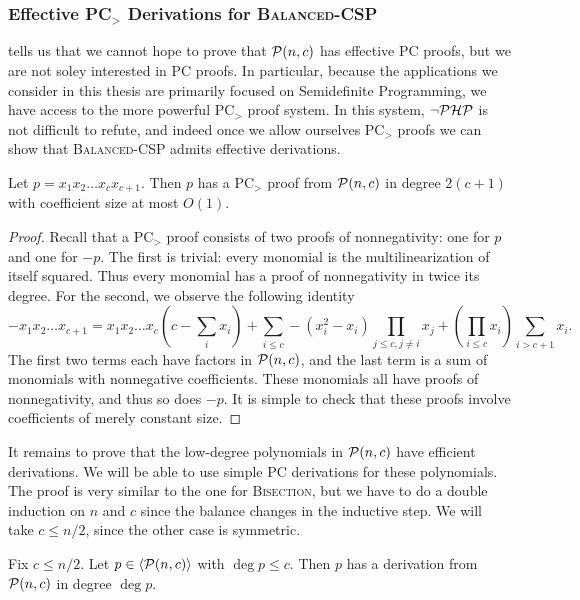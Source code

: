 \subsubsection{Effective PC$_>$ Derivations for \textsc{Balanced-CSP}}
 tells us that we cannot hope to prove that $\mathcal P(n,c)$ has effective PC proofs, but we are not soley interested in PC proofs. In particular, because the applications we consider in this thesis are primarily focused on Semidefinite Programming, we have access to the more powerful PC$_>$ proof system. In this system, $\neg\mathcal P\mathcal H\mathcal P$ is not difficult to refute, and indeed once we allow ourselves PC$_>$ proofs we can show that \textsc{Balanced-CSP} admits effective derivations.
\begin{lemma}\label{lem:highdeg-easy}
Let $p = x_1x_2\dots x_c x_{c+1}$. Then $p$ has a PC$_>$ proof from $\mathcal P(n,c)$ in degree $2(c+1)$ with coefficient size at most $O(1)$. 
\end{lemma}
\begin{proof}
Recall that a PC$_>$ proof consists of two proofs of nonnegativity: one for $p$ and one for $-p$. The first is trivial: every monomial is the multilinearization of itself squared. Thus every monomial has a proof of nonnegativity in twice its degree. For the second, we observe the following identity
\[-x_1x_2\dots x_{c+1} = x_1x_2\dots x_c\left(c - \sum_i x_i\right) + \sum_{i \leq c} -(x_i^2 - x_i) \prod_{j \leq c, j\neq i} x_j + \left(\prod_{i \leq c} x_i\right) \sum_{i > c+1} x_i. \]
The first two terms each have factors in $\mathcal P(n,c)$, and the last term is a sum of monomials with nonnegative coefficients. These monomials all have proofs of nonnegativity, and thus so does $-p$. It is simple to check that these proofs involve coefficients of merely constant size. 
\end{proof}
It remains to prove that the low-degree polynomials in $\mathcal P(n,c)$ have efficient derivations. We will be able to use simple PC derivations for these polynomials. The proof is very similar to the one for \textsc{Bisection}, but we have to do a double induction on $n$ and $c$ since the balance changes in the inductive step. We will take $c \leq n/2$, since the other case is symmetric.
\begin{lemma}\label{lem:lowdeg-easy}
Fix $c \leq n/2$. Let $p \in \langle \mathcal P(n,c) \rangle$ with $\deg p \leq c$. Then $p$ has a derivation from $\mathcal P(n,c)$ in degree $\deg p$. 
\end{lemma}
